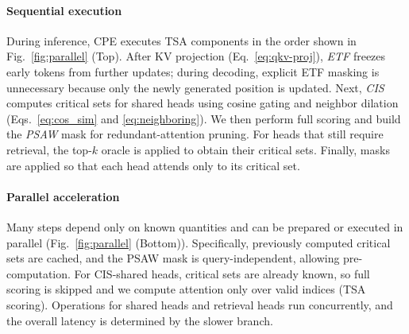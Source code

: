 \paragraph{Sequential execution} During inference, CPE executes TSA components in the order shown in Fig.~\ref{fig:parallel} (Top). After KV projection (Eq.~\eqref{eq:qkv-proj}), %
\textit{ETF} freezes early tokens from further updates; during decoding, explicit ETF masking is unnecessary because only the newly generated position is updated.
Next, \textit{CIS} computes critical sets for shared heads using cosine gating and neighbor dilation (Eqs.~\eqref{eq:cos_sim} and \eqref{eq:neighboring}). We then perform full scoring and build the \textit{PSAW} mask for redundant-attention pruning. For heads that still require retrieval, the top-$k$ oracle is applied to obtain their critical sets. Finally, masks are applied so that each head attends only to its critical set.


\paragraph{Parallel acceleration} Many steps depend only on known quantities and can be prepared or executed in parallel (Fig.~\ref{fig:parallel} (Bottom)). Specifically, previously computed critical sets are cached, and the PSAW mask is query-independent, allowing pre-computation. For CIS-shared heads, critical sets are already known, so full scoring is skipped and we compute attention only over valid indices (TSA scoring). Operations for shared heads and retrieval heads run concurrently, and the overall latency is determined by the slower branch.





